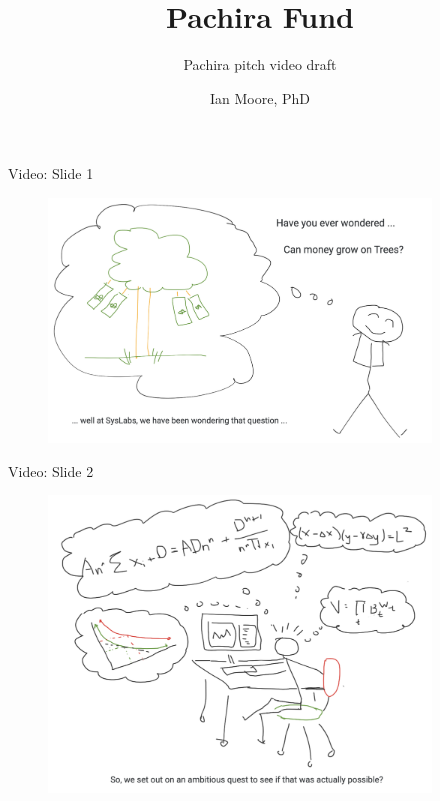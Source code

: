 \documentclass[10pt,xcolor=svgnames]{beamer} %
\title{Pachira Fund}
\author[Name]{Ian Moore, PhD \inst{$\dagger$}}%
\subtitle{Pachira pitch video draft}
\institute[shortinst]{\inst{$\dagger$} Tokenomics Researcher / Engineer @ Syslabs (email: imoore@syscoin.org) }
\begin{document}
{
\maketitle
}%



\begin{frame}{Video: Slide 1}
\begin{figure}[h!]
\includegraphics[width=4in]{img/slide1.png}
\label{fig:dex_forest}
\end{figure}
\end{frame}


\begin{frame}{Video: Slide 2}
\begin{figure}[h!]
\includegraphics[width=4in]{img/slide2.png}
\label{fig:dex_forest}
\end{figure}
\end{frame}
\end{document}
